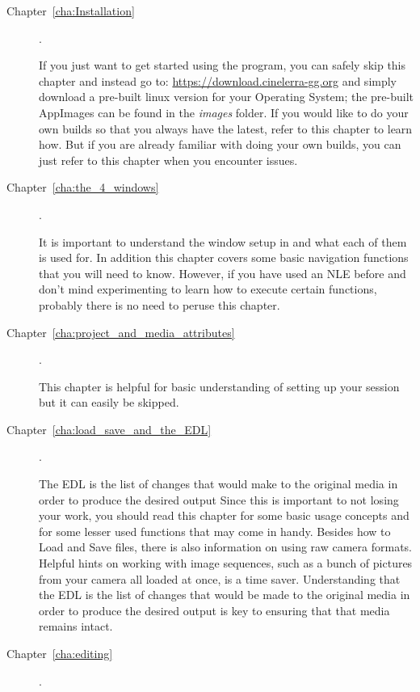 \begin{description}
    \item[Chapter~\ref{cha:Installation} ] .

        If you just want to get started using the program, you can safely skip this chapter and instead go to:
        {\small \url{https://download.cinelerra-gg.org}}
        and simply download a pre-built linux version for your Operating System; the pre-built \CGG{} AppImages can be found in the \textit{images} folder. If you would like to do your own builds so that you always have the latest, refer to this chapter to learn how.
        But if you are already familiar with doing your own builds, you can just refer to this chapter when you encounter issues.
    \item[Chapter~\ref{cha:the_4_windows} ] .

        It is important to understand the window setup in \CGG{} and what each of them is used for.
        In addition this chapter covers some basic navigation functions that you will need to know.
        However, if you have used an NLE before and don’t mind experimenting to learn how to execute certain functions, probably there is no need to peruse this chapter.
    \item[Chapter~\ref{cha:project_and_media_attributes}] .

        This chapter is helpful for basic understanding of setting up your session but it can easily be skipped.

    \item[Chapter~\ref{cha:load_save_and_the_EDL}] .

		The EDL is the list of changes that \CGG{} would make to the original media in order to produce the desired output
        Since this is important to not losing your work, you should read this chapter for some basic usage concepts and for some lesser used functions that may come in handy.
        Besides how to Load and Save files, there is also information on using raw camera formats.
        Helpful hints on working with image sequences, such as a bunch of pictures from your camera all loaded at once, is a time saver. Understanding that the EDL is the list of changes that would be made to the original media in order to produce the desired output is key to ensuring that that media remains intact.
        
    \item[Chapter~\ref{cha:editing}] .


\end{description}
